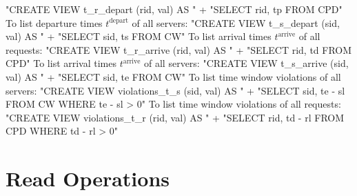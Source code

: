\nwenddocs{}\endmoddef{}
"CREATE VIEW t_r_depart (rid, val) AS "
  + "SELECT rid, tp FROM CPD"
\nwendcode{}\nwdocspar
To list departure times $t^\textrm{depart}$ of all servers:
\nwenddocs{}\endmoddef{}
"CREATE VIEW t_s_depart (sid, val) AS "
  + "SELECT sid, ts FROM CW"
\nwendcode{}\nwdocspar
To list arrival times $t^\textrm{arrive}$ of all requests:
\nwenddocs{}\endmoddef{}
"CREATE VIEW t_r_arrive (rid, val) AS "
  + "SELECT rid, td FROM CPD"
\nwendcode{}\nwdocspar
To list arrival times $t^\textrm{arrive}$ of all servers:
\nwenddocs{}\endmoddef{}
"CREATE VIEW t_s_arrive (sid, val) AS "
  + "SELECT sid, te FROM CW"
\nwendcode{}\nwdocspar
To list time window violations of all servers:
\nwenddocs{}\endmoddef{}
"CREATE VIEW violations_t_s (sid, val) AS "
  + "SELECT sid, te - sl FROM CW WHERE te - sl > 0"
\nwendcode{}\nwdocspar
To list time window violations of all requests:
\nwenddocs{}\endmoddef{}
"CREATE VIEW violations_t_r (rid, val) AS "
  + "SELECT rid, td - rl FROM CPD WHERE td - rl > 0"
\nwendcode{}\nwdocspar
\nwenddocs{}\chapter{Read Operations}
\label{read}

